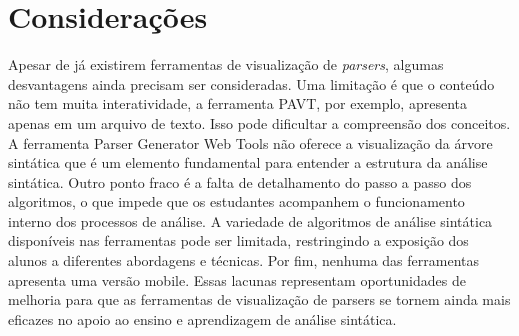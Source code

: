 \section{Considerações}
Apesar de já existirem ferramentas de visualização de \textit{parsers}, algumas desvantagens ainda precisam ser consideradas. Uma limitação é que o conteúdo não tem muita interatividade, a ferramenta PAVT, por exemplo, apresenta apenas em um arquivo de texto. Isso pode dificultar a compreensão dos conceitos. A ferramenta Parser Generator Web Tools não oferece a visualização da árvore sintática que é um elemento fundamental para entender a estrutura da análise sintática. Outro ponto fraco é a falta de detalhamento do passo a passo dos algoritmos, o que impede que os estudantes acompanhem o funcionamento interno dos processos de análise. A variedade de algoritmos de análise sintática disponíveis nas ferramentas pode ser limitada, restringindo a exposição dos alunos a diferentes abordagens e técnicas. Por fim, nenhuma das ferramentas apresenta uma versão mobile. Essas lacunas representam oportunidades de melhoria para que as ferramentas de visualização de parsers se tornem ainda mais eficazes no apoio ao ensino e aprendizagem de análise sintática.

% 
